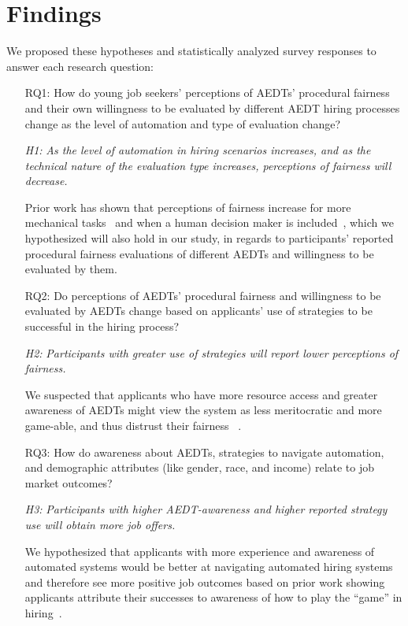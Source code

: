 \section{Findings}
\label{sec:results}

We proposed these hypotheses and statistically analyzed survey responses to answer each research question:

\begin{enumerate}
\item[RQ1:] How do young job seekers' perceptions of AEDTs' procedural fairness and their own willingness to be evaluated by different AEDT hiring processes change as the level of automation and type of evaluation change?
\item[\textit{H1:}] \textit{As the level of automation in hiring scenarios increases, and as the technical nature of the evaluation type increases, perceptions of fairness will decrease.}
\item[ ] Prior work has shown that perceptions of fairness increase for more mechanical tasks~\cite{lee2018understanding, zhang2022examining} and when a human decision maker is included~\cite{gonzalez2022allying}, which we hypothesized will also hold in our study, in regards to participants' reported procedural fairness evaluations of different AEDTs and willingness to be evaluated by them.
\end{enumerate}

\begin{enumerate}
\item[RQ2:] Do perceptions of AEDTs' procedural fairness and willingness to be evaluated by AEDTs change based on applicants' use of strategies to be successful in the hiring process?
\item[\textit{H2:}] \textit{Participants with greater use of strategies will report lower perceptions of fairness.}
\item[ ] We suspected that applicants who have more resource access and greater awareness of AEDTs might view the system as less meritocratic and more game-able, and thus distrust their fairness ~\cite{leclercq2020gamification, leutner2023game}.
\end{enumerate}

\begin{enumerate}
 \item[RQ3:] How do awareness about AEDTs, strategies to navigate automation, and demographic attributes (like gender, race, and income) relate to job market outcomes?
\item[\textit{H3:}] \textit{Participants with higher AEDT-awareness and higher reported strategy use will obtain more job offers.}
\item[ ] We hypothesized that applicants with more experience and awareness of automated systems would be better at navigating automated hiring systems and therefore see more positive job outcomes based on prior work showing applicants attribute their successes to awareness of how to play the ``game'' in hiring~\cite{armstrong2023navigating, chua2021playing}.
\end{enumerate}

